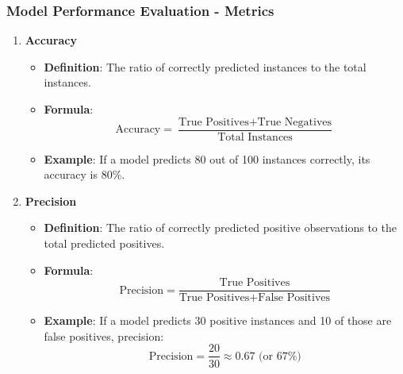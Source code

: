\documentclass[aspectratio=169]{beamer}
\begin{document}
\begin{frame}[fragile]
    \frametitle{Model Performance Evaluation - Metrics}
    \begin{enumerate}
        \item \textbf{Accuracy}
        \begin{itemize}
            \item \textbf{Definition}: The ratio of correctly predicted instances to the total instances.
            \item \textbf{Formula}:
            \[
            \text{Accuracy} = \frac{\text{True Positives} + \text{True Negatives}}{\text{Total Instances}}
            \]
            \item \textbf{Example}: If a model predicts 80 out of 100 instances correctly, its accuracy is 80\%.
        \end{itemize}

        \item \textbf{Precision}
        \begin{itemize}
            \item \textbf{Definition}: The ratio of correctly predicted positive observations to the total predicted positives.
            \item \textbf{Formula}:
            \[
            \text{Precision} = \frac{\text{True Positives}}{\text{True Positives} + \text{False Positives}}
            \]
            \item \textbf{Example}: If a model predicts 30 positive instances and 10 of those are false positives, precision:
            \[
            \text{Precision} = \frac{20}{30} \approx 0.67 \text{ (or 67\%)}
            \]
        \end{itemize}
    \end{enumerate}
\end{frame}
\end{document}
